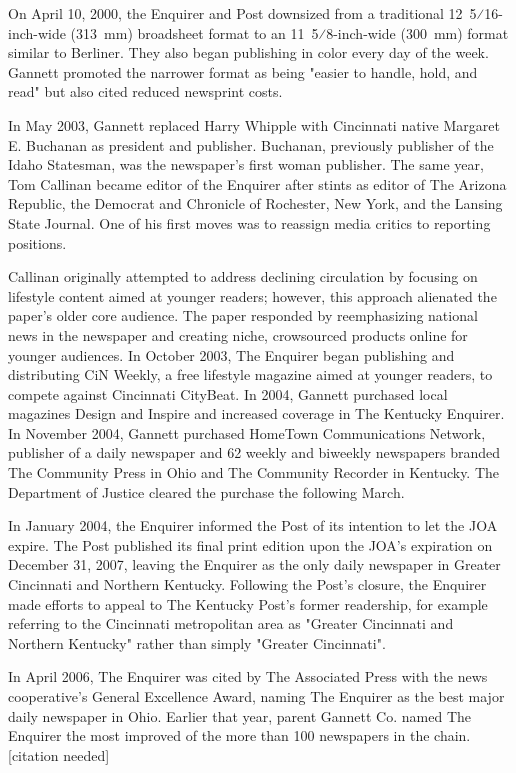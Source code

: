 On April 10, 2000, the Enquirer and Post downsized from a traditional
12~5⁄16-inch-wide (313~mm) broadsheet format to an 11~5⁄8-inch-wide
(300~mm) format similar to Berliner. They also began publishing in color
every day of the week. Gannett promoted the narrower format as being
"easier to handle, hold, and read" but also cited reduced newsprint
costs.

In May 2003, Gannett replaced Harry Whipple with Cincinnati native
Margaret E. Buchanan as president and publisher. Buchanan, previously
publisher of the Idaho Statesman, was the newspaper's first woman
publisher. The same year, Tom Callinan became editor of the Enquirer
after stints as editor of The Arizona Republic, the Democrat and
Chronicle of Rochester, New York, and the Lansing State Journal. One of
his first moves was to reassign media critics to reporting positions.

Callinan originally attempted to address declining circulation by
focusing on lifestyle content aimed at younger readers; however, this
approach alienated the paper's older core audience. The paper responded
by reemphasizing national news in the newspaper and creating niche,
crowsourced products online for younger audiences. In October 2003, The
Enquirer began publishing and distributing CiN Weekly, a free lifestyle
magazine aimed at younger readers, to compete against Cincinnati
CityBeat. In 2004, Gannett purchased local magazines Design and Inspire
and increased coverage in The Kentucky Enquirer. In November 2004,
Gannett purchased HomeTown Communications Network, publisher of a daily
newspaper and 62 weekly and biweekly newspapers branded The Community
Press in Ohio and The Community Recorder in Kentucky. The Department of
Justice cleared the purchase the following March.

In January 2004, the Enquirer informed the Post of its intention to let
the JOA expire. The Post published its final print edition upon the
JOA's expiration on December 31, 2007, leaving the Enquirer as the only
daily newspaper in Greater Cincinnati and Northern Kentucky. Following
the Post's closure, the Enquirer made efforts to appeal to The Kentucky
Post's former readership, for example referring to the Cincinnati
metropolitan area as "Greater Cincinnati and Northern Kentucky" rather
than simply "Greater Cincinnati".

In April 2006, The Enquirer was cited by The Associated Press with the
news cooperative's General Excellence Award, naming The Enquirer as the
best major daily newspaper in Ohio. Earlier that year, parent Gannett
Co. named The Enquirer the most improved of the more than 100 newspapers
in the chain.{[}citation needed{]}

